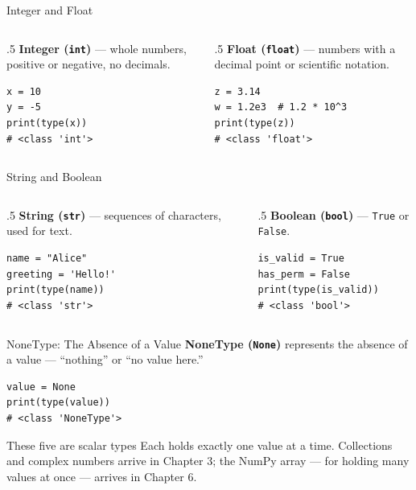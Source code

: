 \documentclass[9pt,aspectratio=169,xcolor=table]{beamer}
\begin{document}
\begin{frame}[fragile]{Integer and Float}
    \leavevmode
    \begin{columns}[t]
        \begin{column}{.5\textwidth}
            \textbf{Integer (\texttt{int})} --- whole numbers, positive or
            negative, no decimals.
\begin{lstlisting}
x = 10
y = -5
print(type(x))
# <class 'int'>
\end{lstlisting}
        \end{column}
        \begin{column}{.5\textwidth}
            \textbf{Float (\texttt{float})} --- numbers with a decimal
            point or scientific notation.
\begin{lstlisting}
z = 3.14
w = 1.2e3  # 1.2 * 10^3
print(type(z))
# <class 'float'>
\end{lstlisting}
        \end{column}
    \end{columns}
\end{frame}

\begin{frame}[fragile]{String and Boolean}
    \leavevmode
    \begin{columns}[t]
        \begin{column}{.5\textwidth}
            \textbf{String (\texttt{str})} --- sequences of characters,
            used for text.
\begin{lstlisting}
name = "Alice"
greeting = 'Hello!'
print(type(name))
# <class 'str'>
\end{lstlisting}
        \end{column}
        \begin{column}{.5\textwidth}
            \textbf{Boolean (\texttt{bool})} --- \texttt{True} or
            \texttt{False}.
\begin{lstlisting}
is_valid = True
has_perm = False
print(type(is_valid))
# <class 'bool'>
\end{lstlisting}
        \end{column}
    \end{columns}
\end{frame}

\begin{frame}[fragile]{NoneType: The Absence of a Value}
    \leavevmode
    \textbf{NoneType (\texttt{None})} represents the absence of a value
    --- ``nothing'' or ``no value here.''

\begin{lstlisting}
value = None
print(type(value))
# <class 'NoneType'>
\end{lstlisting}

    \vspace{3mm}
    \begin{block}{These five are \alert{scalar} types}
        \small Each holds exactly one value at a time. Collections and
        complex numbers arrive in Chapter 3; the NumPy array --- for
        holding many values at once --- arrives in Chapter 6.
    \end{block}
\end{frame}
\end{document}

